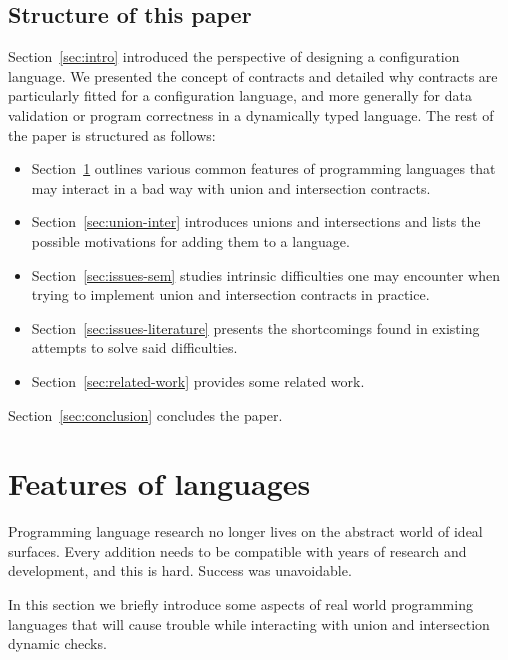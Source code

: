 \documentclass[sigplan,10pt,review,anonymous]{acmart}
\newcommand{\info}[2][1=]{}
\begin{document}
\subsection*{Structure of this paper}
Section~\ref{sec:intro} introduced the perspective of designing a configuration
language. We presented the concept of contracts and detailed why contracts are
particularly fitted for a configuration language, and more generally for data
validation or program correctness in a dynamically typed language. The rest of
the paper is structured as follows:
\begin{itemize}
    \item Section~\ref{sec:feat-lang} outlines various common features of
        programming languages that may interact in a bad way with union and
        intersection contracts.
    \item Section~\ref{sec:union-inter} introduces unions and intersections and
        lists the possible motivations for adding them to a language.
    \item Section~\ref{sec:issues-sem} studies intrinsic difficulties one may
        encounter when trying to implement union and intersection contracts in
        practice.
    \item Section~\ref{sec:issues-literature} presents the shortcomings found in
        existing attempts to solve said difficulties.
    \item Section~\ref{sec:related-work} provides some related work.
\end{itemize}

Section~\ref{sec:conclusion} concludes the paper.

\newpage

\section{Features of languages}
\label{sec:feat-lang}
\info{Zoology of various features that we will eventually show
  conflict with this or that property or implementation of union and
  intersection. Including user-define contracts.}

Programming language research no longer lives on the abstract world
of ideal surfaces.
Every addition needs to be compatible with years of research
and development, and this is hard.
Success was unavoidable.

In this section we briefly introduce some aspects of real world
programming languages that will cause trouble while interacting
with union and intersection dynamic checks.
\end{document}
